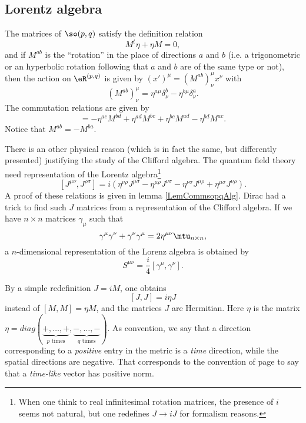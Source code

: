 \subsection{Lorentz algebra}

\begin{lemma}		\label{LemCommsopqAlg}
The matrices of $\so(p,q)$ satisfy the definition relation
\begin{equation}
	M^t\eta+\eta M=0,
\end{equation}
and if $M^{ab}$ is the ``rotation'' in the place of directions $a$ and $b$ (i.e. a trigonometric or an hyperbolic rotation following that $a$ and $b$ are of the same type or not), then the action on $\eR^{(p,q)}$ is given by $(x')^{\mu}=(M^{ab})^{\mu}_{\nu}x^{\nu}$ with
\begin{equation}
	(M^{ab})^{\mu}_{\nu}=\eta^{a\mu}\delta^b_{\nu}-\eta^{b\mu}\delta^a_{\nu}.
\end{equation}
The commutation relations are given by
\begin{equation}
	[M^{ab},M^{cd}]=-\eta^{ac}M^{bd}+\eta^{ad}M^{bc}+\eta^{bc}M^{ad}-\eta^{bd}M^{ac}.
\end{equation}
Notice that $M^{ab}=-M^{ba}$. 
\end{lemma}

There is an other physical reason (which is in fact the same, but differently presented) justifying the study of the Clifford algebra. The quantum field theory need representation of the Lorentz algebra\footnote{When one think to real infinitesimal rotation matrices, the presence of $i$ seems not natural, but one redefines $J\to iJ$ for formalism reasons.}
\[
 [J^{\mu\nu},J^{\rho\sigma}]=i(\eta^{\nu\rho}J^{\mu\sigma}-\eta^{\mu\rho}J^{\nu\sigma}
 -\eta^{\nu\sigma}J^{\mu\rho}+\eta^{\mu\sigma}J^{\nu\rho}).
\]
A proof of these relations is given in lemma \ref{LemCommsopqAlg}. Dirac had a trick to find such $J$ matrices from a representation of the Clifford algebra. If we have $n\times n$ matrices $\gamma_{\mu}$ such that
\[
	\gamma^{\mu}\gamma^{\nu}+\gamma^{\nu}\gamma^{\mu}=2\eta^{\mu\nu}\mtu_{n\times n},
\]
a $n$-dimensional representation of the Lorenz algebra is obtained by
\[
	S^{\mu\nu}=\frac{i}{4}\left[\gamma^{\mu},\gamma^{\nu}\right].
\]

By a simple redefinition $J=iM$, one obtains 
\begin{equation}			\label{EqJJietaJcomm}
	[J,J]=i\eta J
\end{equation}
instead of $[M,M]=\eta M$, and the matrices $J$ are Hermitian. Here $\eta$ is the matrix $\eta=diag(\underbrace{+,\ldots,+}_{\text{$p$ times}},\underbrace{-,\ldots,-}_{\text{$q$ times}})$. As convention, we say that a direction corresponding to a \emph{positive} entry in the metric is a \emph{time} direction, while the spatial directions are negative. That corresponds to the convention of page \pageref{PgDefsGenre} to say that a \emph{time-like} vector has positive norm.

